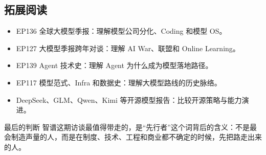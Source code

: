 \subsection{拓展阅读}

\begin{itemize}
\item EP136 全球大模型季报：理解模型公司分化、Coding 和模型 OS。
\item EP127 大模型季报跨年对谈：理解 AI War、联盟和 Online Learning。
\item EP139 Agent 技术史：理解 Agent 为什么成为模型落地路径。
\item EP117 模型范式、Infra 和数据史：理解大模型路线的历史脉络。
\item DeepSeek、GLM、Qwen、Kimi 等开源模型报告：比较开源策略与能力演进。
\end{itemize}

\begin{importantbox}{最后的判断}
智谱这期访谈最值得带走的，是“先行者”这个词背后的含义：不是最会制造声量的人，而是在制度、技术、工程和商业都不确定的时候，先把路走出来的人。
\end{importantbox}


